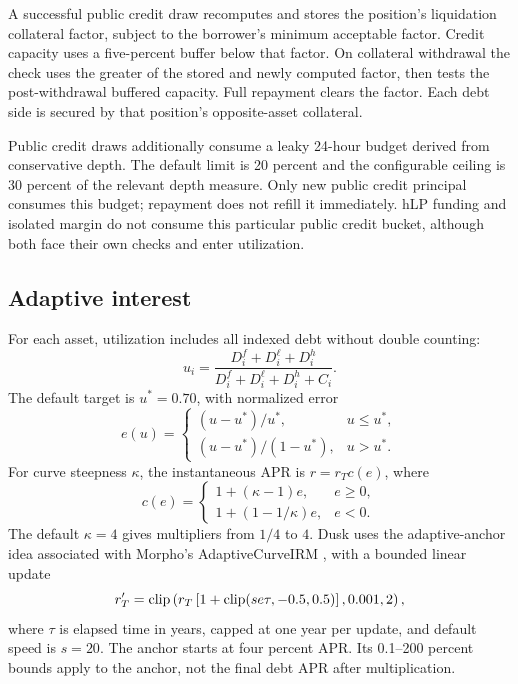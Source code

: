 A successful public credit draw recomputes and stores the position's liquidation collateral factor, subject to the borrower's minimum acceptable factor. Credit capacity uses a five-percent buffer below that factor. On collateral withdrawal the check uses the greater of the stored and newly computed factor, then tests the post-withdrawal buffered capacity. Full repayment clears the factor. Each debt side is secured by that position's opposite-asset collateral.

Public credit draws additionally consume a leaky 24-hour budget derived from conservative depth. The default limit is 20 percent and the configurable ceiling is 30 percent of the relevant depth measure. Only new public credit principal consumes this budget; repayment does not refill it immediately. hLP funding and isolated margin do not consume this particular public credit bucket, although both face their own checks and enter utilization.

\subsection{Adaptive interest}

For each asset, utilization includes all indexed debt without double counting:
\begin{equation}
u_i=\frac{D_i^f+D_i^\ell+D_i^h}{D_i^f+D_i^\ell+D_i^h+C_i}.
\end{equation}
The default target is $u^*=0.70$, with normalized error
\begin{equation}
e(u)=\begin{cases}(u-u^*)/u^*,&u\le u^*,\\(u-u^*)/(1-u^*),&u>u^*.
\end{cases}
\end{equation}
For curve steepness $\kappa$, the instantaneous APR is $r=r_Tc(e)$, where
\begin{equation}
c(e)=\begin{cases}1+(\kappa-1)e,&e\ge0,\\1+(1-1/\kappa)e,&e<0.
\end{cases}
\end{equation}
The default $\kappa=4$ gives multipliers from $1/4$ to $4$. Dusk uses the adaptive-anchor idea associated with Morpho's AdaptiveCurveIRM \cite{morpho-irm-github}, with a bounded linear update
\begin{equation}
r_T'=\operatorname{clip}\left(r_T\left[1+\operatorname{clip}(se\tau,-0.5,0.5)\right],0.001,2\right),
\label{eq:irm}
\end{equation}
where $\tau$ is elapsed time in years, capped at one year per update, and default speed is $s=20$. The anchor starts at four percent APR. Its 0.1--200 percent bounds apply to the anchor, not the final debt APR after multiplication.

